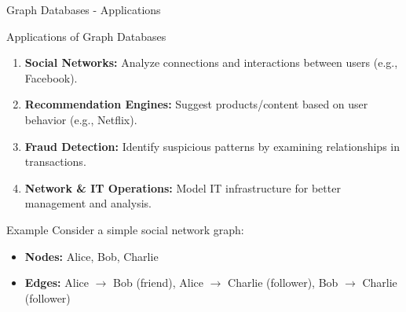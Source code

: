 \documentclass[aspectratio=169]{beamer}
\begin{document}
\begin{frame}[fragile]{Graph Databases - Applications}
    \begin{block}{Applications of Graph Databases}
        \begin{enumerate}
            \item \textbf{Social Networks:} Analyze connections and interactions between users (e.g., Facebook).
            \item \textbf{Recommendation Engines:} Suggest products/content based on user behavior (e.g., Netflix).
            \item \textbf{Fraud Detection:} Identify suspicious patterns by examining relationships in transactions.
            \item \textbf{Network \& IT Operations:} Model IT infrastructure for better management and analysis.
        \end{enumerate}
    \end{block}
    
    \begin{block}{Example}
        Consider a simple social network graph:
        \begin{itemize}
            \item \textbf{Nodes:} Alice, Bob, Charlie
            \item \textbf{Edges:} Alice $\rightarrow$ Bob (friend), Alice $\rightarrow$ Charlie (follower), Bob $\rightarrow$ Charlie (follower)
        \end{itemize}
    \end{block}
\end{frame}
\end{document}
